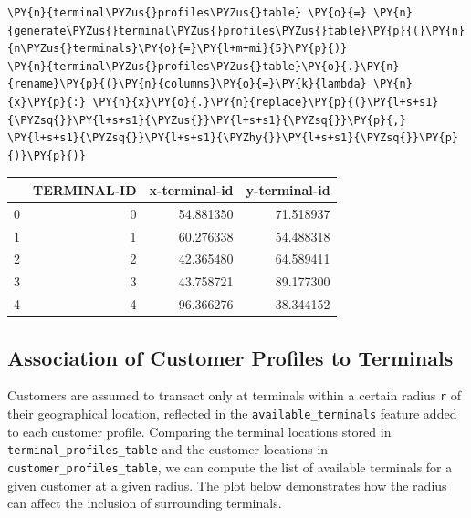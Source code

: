     \begin{tcolorbox}[breakable, size=fbox, boxrule=1pt, pad at break*=1mm,colback=cellbackground, colframe=cellborder]
\begin{Verbatim}[commandchars=\\\{\}]
\PY{n}{terminal\PYZus{}profiles\PYZus{}table} \PY{o}{=} \PY{n}{generate\PYZus{}terminal\PYZus{}profiles\PYZus{}table}\PY{p}{(}\PY{n}{n\PYZus{}terminals}\PY{o}{=}\PY{l+m+mi}{5}\PY{p}{)}
\PY{n}{terminal\PYZus{}profiles\PYZus{}table}\PY{o}{.}\PY{n}{rename}\PY{p}{(}\PY{n}{columns}\PY{o}{=}\PY{k}{lambda} \PY{n}{x}\PY{p}{:} \PY{n}{x}\PY{o}{.}\PY{n}{replace}\PY{p}{(}\PY{l+s+s1}{\PYZsq{}}\PY{l+s+s1}{\PYZus{}}\PY{l+s+s1}{\PYZsq{}}\PY{p}{,} \PY{l+s+s1}{\PYZsq{}}\PY{l+s+s1}{\PYZhy{}}\PY{l+s+s1}{\PYZsq{}}\PY{p}{)}\PY{p}{)}
\end{Verbatim}
\end{tcolorbox}
 
            
    
    \begin{center}
\begin{tabular}{lrrr}
\toprule
 & TERMINAL-ID & x-terminal-id & y-terminal-id \\
\midrule
0 & 0 & 54.881350 & 71.518937 \\
1 & 1 & 60.276338 & 54.488318 \\
2 & 2 & 42.365480 & 64.589411 \\
3 & 3 & 43.758721 & 89.177300 \\
4 & 4 & 96.366276 & 38.344152 \\
\bottomrule
\end{tabular}

\end{center}

    

    \hypertarget{association-of-customer-profiles-to-terminals}{%
\subsection{Association of Customer Profiles to
Terminals}\label{association-of-customer-profiles-to-terminals}}

    Customers are assumed to transact only at terminals within a certain
radius \texttt{r} of their geographical location, reflected in the
\texttt{available\_terminals} feature added to each customer profile.
Comparing the terminal locations stored in
\texttt{terminal\_profiles\_table} and the customer locations in
\texttt{customer\_profiles\_table}, we can compute the list of available
terminals for a given customer at a given radius. The plot below
demonstrates how the radius can affect the inclusion of surrounding
terminals.

